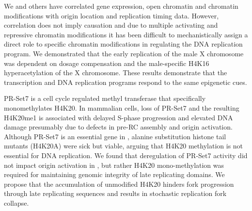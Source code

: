 We and others have correlated gene expression, open chromatin and chromatin modifications with origin location and replication timing data.  However, correlation does not  imply causation and due to multiple activating and repressive chromatin modifications it has been difficult to mechanistically assign a direct role to specific chromatin modifications in regulating the DNA replication program. We demonstrated that the early replication of the \dros male X chromosome was dependent on dosage compensation and the male-specific H4K16 hyperacetylation of the X chromosome\citep{Lubelsky2014-zn}.  These results demonstrate that the transcription and DNA replication programs respond to the same epigenetic cues.

PR-Set7 is a cell cycle regulated methyl transferase that specifically monomethylates H4K20\citep{Beck2012-uc}.  In mammalian cells, loss of PR-Set7 and the resulting H4K20me1 is associated with delayed S-phase progression and elevated DNA damage presumably due to defects in pre-RC assembly and origin activation\citep{Tardat2010-qc}.  %
Although PR-Set7 is an essential gene in \dros, alanine substitution histone tail mutants (H4K20A) were sick but viable\citep{McKay2015-nn}, arguing that H4K20 methylation is not essential for DNA replication. We found that deregulation of PR-Set7 activity did not impact origin activation in \dros, but rather H4K20 mono-methylation was required for maintaining genomic integrity of late replicating domains\citep{Li2016-fi}.  We propose that the accumulation of unmodified H4K20 hinders fork progression through late replicating sequences and results in stochastic replication fork collapse.


